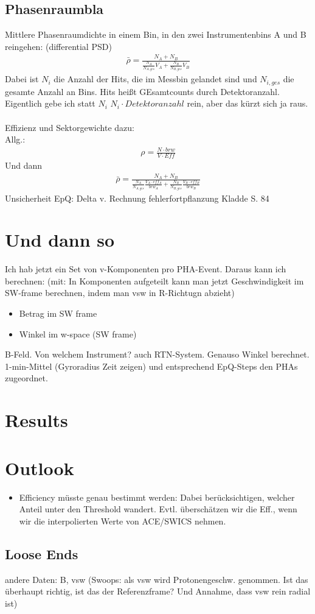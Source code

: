\subsection{Phasenraumbla}
Mittlere Phasenraumdichte in einem Bin, in den zwei Instrumentenbins A und B reingehen:
(differential PSD)
\begin{align}
\bar{\rho} = \frac{N_A + N_B}{\frac{N_A}{N_{A,ges}} V_A + \frac{N_B}{N_{B,ges}} V_B }
\end{align}
Dabei ist $N_i$ die Anzahl der Hits, die im Messbin gelandet sind und $N_{i,ges}$ die gesamte Anzahl an Bins. Hits heißt GEsamtcounts durch Detektoranzahl. Eigentlich gebe ich statt $N_i$ $N_i \cdot Detektoranzahl$ rein, aber das kürzt sich ja raus.\\ \\
Effizienz und Sektorgewichte dazu:\\
Allg.:
\begin{align*}
\rho = \frac{N \cdot brw}{V \cdot Eff}
\end{align*}
Und dann
\begin{align}
\bar{\rho} = \frac{N_A + N_B}{\frac{N_A}{N_{A,ges}} \frac{V_A \cdot eff_A}{brw_A} + \frac{N_B}{N_{B,ges}} \frac{V_B \cdot eff_B}{brw_B} }
\end{align}
Unsicherheit EpQ: Delta v. Rechnung fehlerfortpflanzung Kladde S. 84


%
%
%
\section{Und dann so}
Ich hab jetzt ein Set von v-Komponenten pro PHA-Event. Daraus kann ich berechnen:
(mit: In Komponenten aufgeteilt kann man jetzt Geschwindigkeit im SW-frame berechnen, indem man vsw in R-Richtugn abzieht)
\begin{itemize}
	\item Betrag im SW frame
	\item Winkel im w-space (SW frame)
\end{itemize}
B-Feld. Von welchem Instrument? auch RTN-System. Genauso Winkel berechnet.\\
1-min-Mittel (Gyroradius Zeit zeigen) und entsprechend EpQ-Steps den PHAs zugeordnet.


%
%
%
\section{Results}



%
%
%
\section{Outlook}
\begin{itemize}
	\item Efficiency müsste genau bestimmt werden: Dabei berücksichtigen, welcher Anteil unter den Threshold wandert. Evtl. überschätzen wir die Eff., wenn wir die interpolierten Werte von ACE/SWICS nehmen.
\end{itemize}







\subsection{Loose Ends}
andere Daten: B, vsw (Swoops: als vsw wird Protonengeschw. genommen. Ist das überhaupt richtig, ist das der Referenzframe? Und Annahme, dass vsw rein radial ist)
